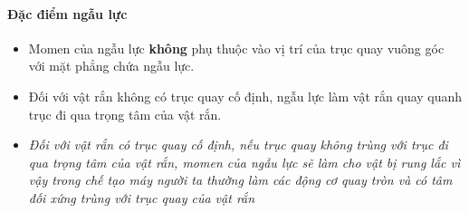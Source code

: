 \paragraph{Đặc điểm ngẫu lực}
\begin{itemize}
\item Momen của ngẫu lực \textbf{không} phụ thuộc vào vị trí của trục quay vuông góc với mặt phẳng chứa ngẫu lực.
\item Đối với vật rắn không có trục quay cố định, ngẫu lực làm vật rắn quay quanh trục đi qua trọng tâm của vật rắn.
\item \textit{Đối với vật rắn có trục quay cố định, nếu trục quay không trùng với trục đi qua trọng tâm của vật rắn, momen của ngẫu lực sẽ làm cho vật bị rung lắc vì vậy trong chế tạo máy người ta thường làm các động cơ quay tròn và có tâm đối xứng trùng với trục quay của vật rắn}
\end{itemize}
